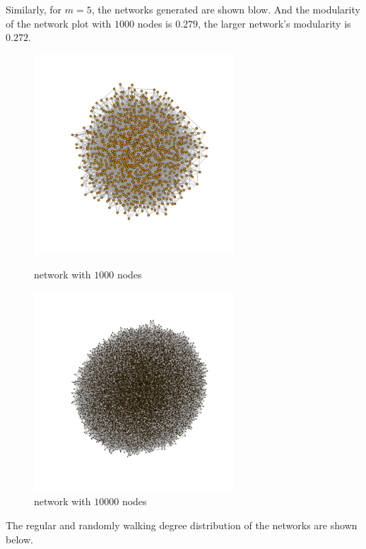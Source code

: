 \documentclass[draftcls,12pt,onecolumn]{IEEEtran}
\begin{document}
 Similarly, for $m = 5$, the networks generated are shown blow. And the modularity of the network plot with $1000$ nodes is $0.279$, the larger network's modularity is $0.272$.
\begin{figure}[htbp]
\centering
\begin{minipage}[t]{0.48\textwidth}
\centering
\includegraphics[width=7.5cm]{img/2_g_2_network}
\caption{network with $1000$ nodes}
\end{minipage}
\begin{minipage}[t]{0.48\textwidth}
\centering
\includegraphics[width=7.5cm]{img/2_g_2_network2}
\caption{network with $10000$ nodes}
\end{minipage}
\end{figure}

The regular and randomly walking degree distribution of the networks are shown below.
\end{document}
